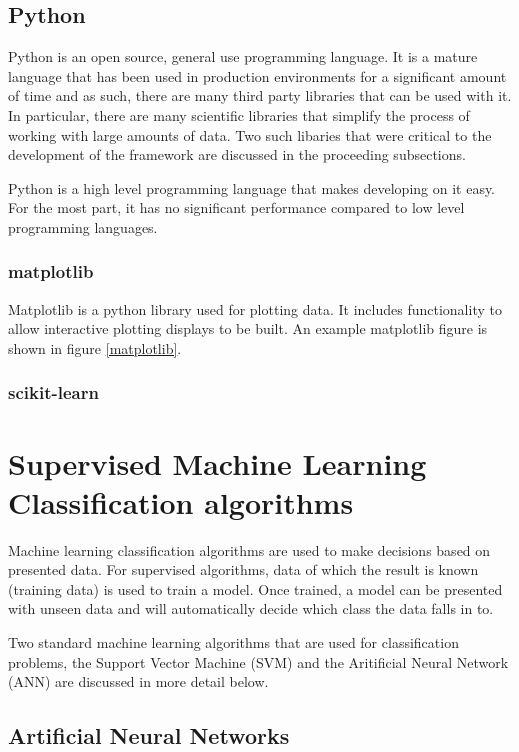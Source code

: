 \subsection{Python}
Python is an open source, general use programming language. It is a mature language that has been used in production environments for a significant amount of time and as such, there are many third party libraries that can be used with it. In particular, there are many scientific libraries that simplify the process of working with large amounts of data. Two such libaries that were critical to the development of the framework are discussed in the proceeding subsections. 

Python is a high level programming language that makes developing on it easy. For the most part, it has no significant performance compared to low level programming languages.

\subsubsection{matplotlib}
Matplotlib is a python library used for plotting data. It includes functionality to allow interactive plotting displays to be built. An example matplotlib figure is shown in figure \ref{matplotlib}.



\subsubsection{scikit-learn}

\section{Supervised Machine Learning Classification algorithms}

Machine learning classification algorithms are used to make decisions based on presented data. For supervised algorithms, data of which the result is known (training data) is used to train a model. Once trained, a model can be presented with unseen data and will automatically decide which class the data falls in to. 

Two standard machine learning algorithms that are used for classification problems, the Support Vector Machine (SVM) and the Aritificial Neural Network (ANN) are discussed in more detail below. 

\subsection{Artificial Neural Networks}
\label{ANNAppendix}

